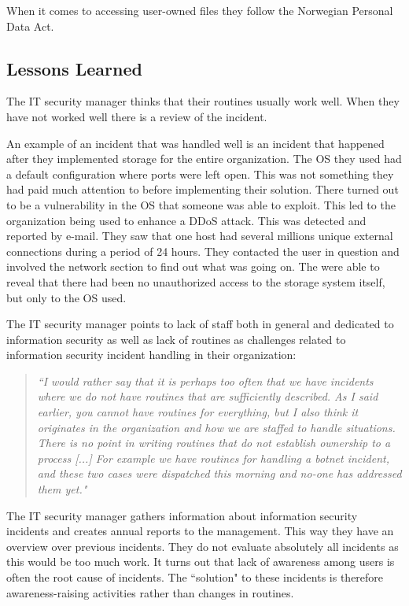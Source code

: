 When it comes to accessing user-owned files they follow the Norwegian Personal Data Act.

\subsection{Lessons Learned}
The IT security manager thinks that their routines usually work well. When they have not worked well there is a review of the incident.

An example of an incident that was handled well is an incident that happened after they implemented storage for the entire organization. The OS they used had a default configuration where ports were left open. This was not something they had paid much attention to before implementing their solution. There turned out to be a vulnerability in the OS that someone was able to exploit. This led to the organization being used to enhance a \ac{DDoS} attack. This was detected and reported by e-mail. They saw that one host had several millions unique external connections during a period of 24 hours. They contacted the user in question  and involved the network section to find out what was going on. The were able to reveal that there had been no unauthorized access to the storage system itself, but only to the OS used.

The IT security manager points to lack of staff  both in general and dedicated to information security as well as lack of routines as challenges related to information security incident handling in their organization: 

\begin{quote}
\textit{``I would rather say that it is perhaps too often that we have incidents where we do not have routines that are sufficiently described. %
As I said earlier, you cannot have routines for everything, but I also think it originates in the organization and how we are staffed to handle situations. There is no point in writing routines that do not establish ownership to a process [...] For example we have routines for handling a botnet incident, and these two cases were dispatched this morning and no-one has addressed them yet."}
\end{quote}

The IT security manager gathers information about information security incidents and creates annual reports to the management. This way they have an overview over previous incidents. They do not evaluate absolutely all incidents as this would be too much work. It turns out that lack of awareness among users is often the root cause of incidents. The ``solution" to these incidents is therefore awareness-raising activities rather than changes in routines.

